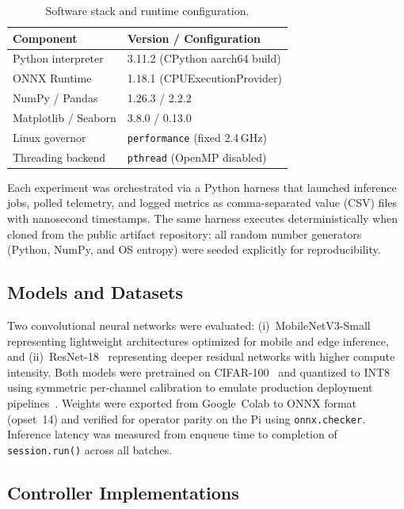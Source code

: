 \documentclass[acmsmall]{acmart}
\begin{document}
\begin{table}[h]
  \centering
  \caption{Software stack and runtime configuration.}
  \label{tab:software}
  \vspace{0.3em}
  \begin{tabular}{ll}
  \toprule
  \textbf{Component} & \textbf{Version / Configuration}\\
  \midrule
  Python interpreter  & 3.11.2 (CPython aarch64 build)\\
  ONNX Runtime        & 1.18.1 (CPUExecutionProvider)\\
  NumPy / Pandas      & 1.26.3 / 2.2.2\\
  Matplotlib / Seaborn & 3.8.0 / 0.13.0\\
  Linux governor      & \texttt{performance} (fixed 2.4\,GHz)\\
  Threading backend   & \texttt{pthread} (OpenMP disabled)\\
  \bottomrule
  \end{tabular}
\end{table}

Each experiment was orchestrated via a Python harness that launched inference jobs, polled telemetry, and logged metrics as comma-separated value (CSV) files with nanosecond timestamps.  
The same harness executes deterministically when cloned from the public artifact repository; all random number generators (Python, NumPy, and OS entropy) were seeded explicitly for reproducibility.

\subsection{Models and Datasets}

Two convolutional neural networks were evaluated:  
(i)~MobileNetV3-Small~\cite{howard2019mobilenetv3} representing lightweight architectures optimized for mobile and edge inference, and  
(ii)~ResNet-18~\cite{szegedy2015going} representing deeper residual networks with higher compute intensity.  
Both models were pretrained on CIFAR-100~\cite{krizhevsky2009learning} and quantized to INT8 using symmetric per-channel calibration to emulate production deployment pipelines~\cite{sze2017efficient}.  
Weights were exported from Google~Colab to ONNX format (opset~14) and verified for operator parity on the Pi using \texttt{onnx.checker}.  
Inference latency was measured from enqueue time to completion of \texttt{session.run()} across all batches.

\subsection{Controller Implementations}
\end{document}
